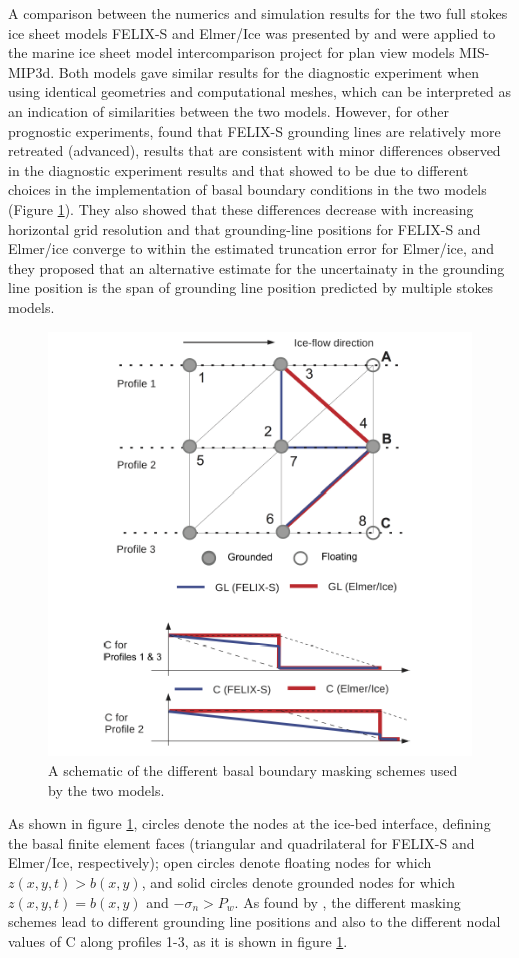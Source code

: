 \documentclass[a4paper,12pt]{article}
\begin{document}
A comparison between the numerics and simulation results for the two full stokes ice sheet models FELIX-S \cite[]{leng2012parallel} and Elmer/Ice \cite[]{gagliardini2013capabilities} was presented by \cite{zhang2017comparison} and were applied to the marine ice sheet model intercomparison project for plan view models MIS-MIP3d. Both models gave similar results for the diagnostic experiment when using identical geometries and computational meshes, which can be interpreted as an indication of similarities between the two models. However, for other prognostic experiments, \cite{zhang2017comparison} found that FELIX-S grounding lines are relatively more retreated (advanced), results that are consistent with minor differences observed in the diagnostic experiment results and that \cite{zhang2017comparison} showed to be due to different choices in the implementation of basal boundary conditions in the two models (Figure \ref{comparison}). They also showed that these differences decrease with increasing horizontal grid resolution and that grounding-line positions for FELIX-S and Elmer/ice converge to within the estimated truncation error for Elmer/ice, and they proposed that an alternative estimate for the uncertainaty in the grounding line position is the span of grounding line position predicted by multiple stokes models. 

\begin{figure}[!h]
	\centering
	\includegraphics[width=0.7\linewidth]{../fig/comparison}
	\caption{A schematic of the different basal boundary masking schemes used by the two models.}
	\label{comparison}
\end{figure}

As shown in figure \ref{comparison}, circles denote the nodes at the ice-bed interface, defining the basal finite element faces (triangular and quadrilateral for FELIX-S and Elmer/Ice, respectively); open circles denote floating nodes for which $z(x,y,t)>b(x,y)$, and solid circles denote grounded nodes for which $z(x,y,t)=b(x,y)$ and $-\sigma_n>P_w$. As found by \cite{zhang2017comparison}, the different masking schemes lead to different grounding line positions and also to the different nodal values of C along profiles 1-3, as it is shown in figure \ref{comparison}.
\end{document}
